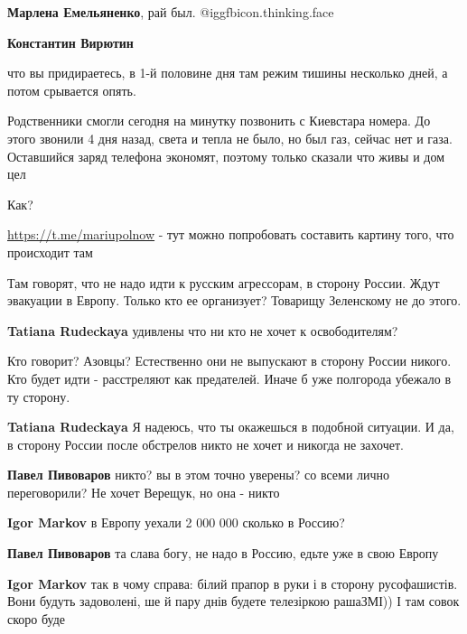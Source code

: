 \begin{itemize}
\begin{itemize}
\textbf{Марлена Емельяненко}, рай был.  @igg{fbicon.thinking.face} 

\textbf{Константин Вирютин} 

что вы придираетесь, в 1-й половине дня там режим тишины несколько дней, а потом срывается опять.

Родственники смогли сегодня на минутку позвонить с Киевстара номера. До этого
звонили 4 дня назад, света и тепла не было, но был газ, сейчас нет и газа.
Оставшийся заряд телефона экономят, поэтому только сказали что живы и дом цел

\end{itemize} %

Как?

\url{https://t.me/mariupolnow} - тут можно попробовать составить картину того, что происходит там


Там говорят, что не надо идти к русским агрессорам, в сторону России. Ждут
эвакуации в Европу. Только кто ее организует? Товарищу Зеленскому не до этого.

\begin{itemize} %
\textbf{Tatiana Rudeckaya} удивлены что ни кто не хочет к освободителям?


Кто говорит? Азовцы? Естественно они не выпускают в сторону России никого. Кто
будет идти - расстреляют как предателей. Иначе б уже полгорода убежало в ту
сторону.

\textbf{Tatiana Rudeckaya} Я надеюсь, что ты окажешься в подобной ситуации. И да, в сторону России после обстрелов никто не хочет и никогда не захочет.

\textbf{Павел Пивоваров} никто? вы в этом точно уверены? со всеми лично переговорили? Не хочет Верещук, но она - никто

\textbf{Igor Markov} в Европу уехали 2 000 000 сколько в Россию?

\textbf{Павел Пивоваров} та слава богу, не надо в Россию, едьте уже в свою Европу

\textbf{Igor Markov} так в чому справа: білий прапор в руки і в сторону русофашистів. Вони будуть задоволені, ше й пару днів будете телезіркою рашаЗМІ)) І там совок скоро буде


\end{itemize}
\end{itemize}
